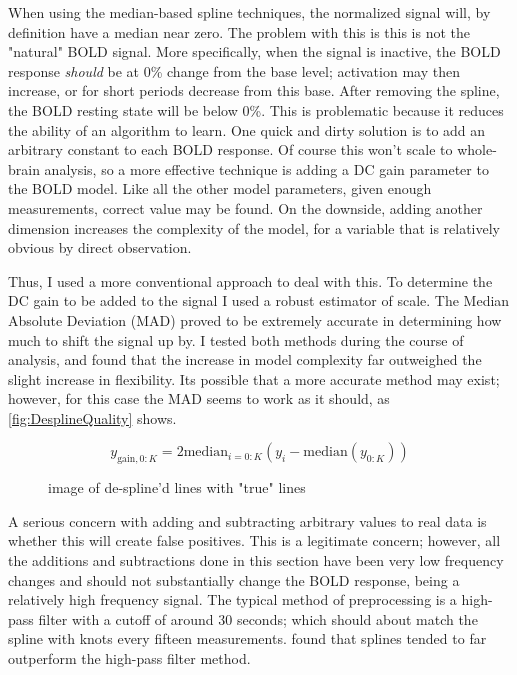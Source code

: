 When using the median-based spline techniques, the normalized signal will,
by definition have a median near zero. 
The problem with this is this is not the "natural" BOLD signal. More specifically,
when the signal is inactive, the BOLD response \emph{should} be at 0\% change from
the base level; activation may then increase, or for short periods decrease from this base.
After removing the spline, the BOLD resting state will be below 0\%.
This is problematic because it reduces the ability of an algorithm to learn.
One quick and dirty solution is to add an arbitrary constant to each BOLD response. 
Of course this won't scale to whole-brain analysis, so a more effective technique 
is adding a DC gain parameter to the BOLD model. 
Like all the other model parameters, given enough measurements, correct
value may be found. On the downside, adding another dimension increases the
complexity of the model, for a variable that is relatively obvious by direct
observation.

Thus, I used a more conventional approach to deal with this. To determine
the DC gain to be added to the signal I used a robust estimator 
of scale. The Median Absolute Deviation (MAD)
proved to be extremely accurate in determining how much to shift the signal up
by. I tested both methods during the course of analysis, and found that the increase 
in model complexity far outweighed the slight increase in flexibility. Its 
possible that a more accurate method may exist; however, for this case the 
MAD seems to work as it should, as \autoref{fig:DesplineQuality} shows. 

\begin{equation}
y_{\text{gain}, 0:K} = 2\text{median}_{i=0:K}(y_i - \text{median}(y_{0:K}))
\end{equation}

\begin{figure}
\caption{image of de-spline'd lines with "true" lines}
\label{fig:DesplineQuality}
\end{figure}

A serious concern with adding and subtracting arbitrary values to 
real data is whether this will create false positives. This is a legitimate
concern; however, all the additions and subtractions done in this section
have been very low frequency changes and should not substantially change
the BOLD response, being a relatively high frequency signal. The typical
method of preprocessing is a high-pass filter with a cutoff of around 30
seconds; which should about match the spline with knots every fifteen 
measurements. \cite{Tanabe2002} found that splines tended to far outperform the
high-pass filter method. 

